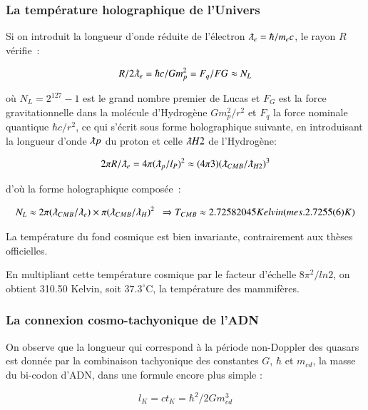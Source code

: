 \documentclass[a4paper,12pt]{article}
\begin{document}
\subsubsection{La température holographique de l'Univers }

     Si on introduit la longueur d'onde réduite de l'électron $\lambdabar_e =  \hbar/m_ec$, le rayon $R$ vérifie :

\begin{equation}
R/2\lambdabar_e = \hbar c/Gm_p^2 = F_q/FG \approx N_L
\end{equation}


où $N_L = 2^{127}-1$ est le grand nombre premier de Lucas et $F_G$ est la force gravitationnelle dans la molécule d'Hydrogène $Gm_p^2/r^2$ et $F_q$ la force nominale quantique $\hbar c/r^2$, ce qui s'écrit sous forme holographique suivante, en introduisant la longueur d'onde $\lambdabar p$ du proton et celle $\lambdabar H2$ de l'Hydrogène:

\begin{equation}
2\pi R/\lambdabar_e = 4\pi (\lambdabar_p /l_P)^2  \approx (4\pi 3) (\lambdabar_{CMB}/\lambdabar_{H2})^3
\end{equation}


d'où la forme holographique composée :

\begin{equation}
N_L \approx 2\pi (\lambdabar_{CMB}/\lambdabar_{e}) \times \pi (\lambdabar_{CMB}/\lambdabar_{H})^2   ~~  \Rightarrow T_{CMB}  \approx 2.72582045  Kelvin    (mes. 2.7255(6) K)
\end{equation}    

La température du fond cosmique est bien invariante, contrairement aux thèses officielles.

En multipliant cette température cosmique par le facteur d'échelle $8 \pi^2/ln2$, on obtient 310.50 Kelvin, soit $37.3^{\circ}$C, la température des mammifères.


\subsubsection{La connexion cosmo-tachyonique de l'ADN} 

      On observe que la longueur qui correspond à la période non-Doppler des quasars est donnée par la combinaison tachyonique des constantes $G$,  $\hbar$ et $m_{cd}$, la masse du bi-codon d'ADN, dans une formule encore plus simple :
      
\begin{equation}
l_K = ct_K  = \hbar^2/2Gm_{cd}^3 
\end{equation}      
     
\end{document}
